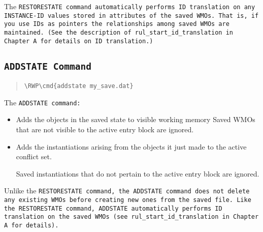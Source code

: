 The \tt{RESTORESTATE} command automatically performs ID translation on
any \tt{INSTANCE-ID} values stored in attributes of the saved
WMOs. That is, if you use IDs as pointers the relationships among
saved WMOs are maintained. (See the description of
\verb|rul_start_id_translation| in Chapter A for details on ID
translation.)

\subsection{\tt{ADDSTATE} Command}

\begin{quote}
\begin{Verbatim}[commandchars=\\\{\}]
\RWP\cmd{addstate my_save.dat}
\end{Verbatim}
\end{quote}

The \tt{ADDSTATE} command:

\begin{itemize}
\item Adds the objects in the saved state to visible working memory
  Saved WMOs that are not visible to the active entry block are
  ignored.
\item Adds the instantiations arising from the objects it just made to
  the active conflict set.

  Saved instantiations that do not pertain to the active entry block
  are ignored.
\end{itemize}

Unlike the \tt{RESTORESTATE} command, the \tt{ADDSTATE} command does not
delete any existing WMOs before creating new ones from the saved
file. Like the \tt{RESTORESTATE} command, \tt{ADDSTATE} automatically
performs ID translation on the saved WMOs (see
\verb|rul_start_id_translation| in Chapter A for details).

